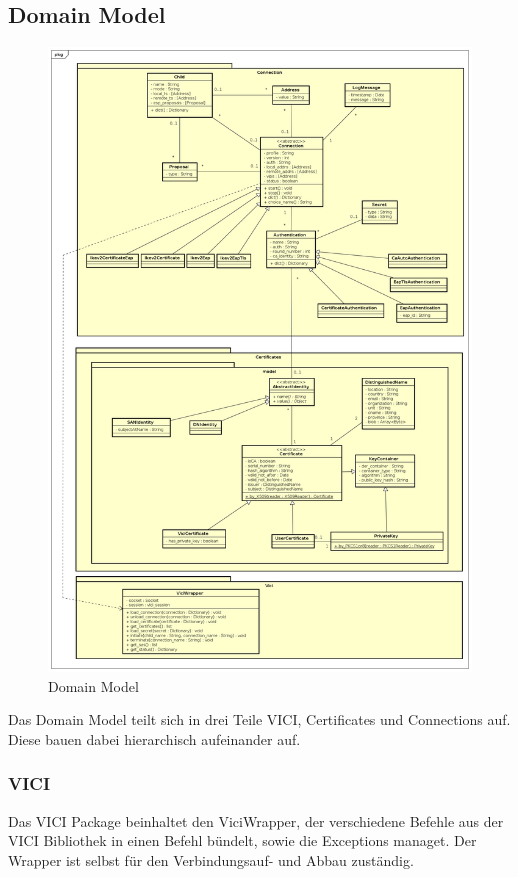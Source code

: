 \subsection{Domain Model}

\begin{figure}[H]
\centering
\includegraphics[width=440pt]{images/domain_model.png}
\caption[Domain Model]{Domain Model}
\end{figure}

Das Domain Model teilt sich in drei Teile VICI, Certificates und Connections auf. Diese bauen dabei hierarchisch aufeinander auf.

\subsubsection{VICI}
Das VICI Package beinhaltet den ViciWrapper, der verschiedene Befehle aus der VICI Bibliothek in einen Befehl bündelt, sowie die Exceptions managet. Der Wrapper ist selbst für den Verbindungsauf- und Abbau zuständig.

